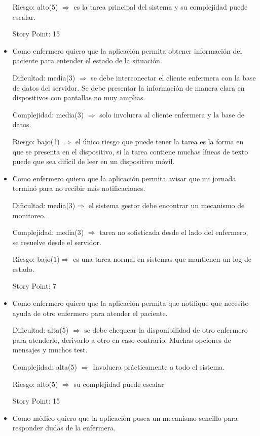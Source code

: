 \documentclass[
11pt, %
]{charter}
\begin{document}
\begin{itemize}
Riesgo: alto(5) $\Rightarrow$ es la tarea principal del sistema y su complejidad puede escalar.

Story Point: 15


\item Como enfermero quiero que la aplicación permita obtener información del paciente para entender el estado de la situación.

Dificultad: media(3) $\Rightarrow$ se debe interconectar el cliente enfermera con la base de datos del servidor. Se debe presentar la información de manera clara en dispositivos con pantallas no muy amplias.

Complejidad: media(3) $\Rightarrow$  solo involucra al cliente enfermera y la base de datos.

Riesgo: bajo(1) $\Rightarrow$ el único riesgo que puede tener la tarea es la forma en que se presenta en el dispositivo, si la tarea contiene muchas líneas de texto puede que sea difícil de leer en un dispositivo móvil.


\item Como enfermero quiero que la aplicación permita avisar que mi jornada terminó para no recibir más notificaciones.

Dificultad: media(3)$\Rightarrow$ el sistema gestor debe encontrar un mecanismo de monitoreo.

Complejidad: media(3) $\Rightarrow$ tarea no sofisticada desde el lado del enfermero, se resuelve desde el servidor.

Riesgo: bajo(1)$\Rightarrow$ es una tarea normal en sistemas que mantienen un log de estado.

Story Point: 7


\item Como enfermero quiero que la aplicación permita que notifique que necesito ayuda de otro enfermero para atender el paciente.


Dificultad: alta(5) $\Rightarrow$ se debe chequear la disponibilidad de otro enfermero para atenderlo, derivarlo a otro en caso contrario. Muchas opciones de mensajes y muchos test.

Complejidad: alta(5) $\Rightarrow$ Involucra prácticamente a todo el sistema.

Riesgo: alto(5) $\Rightarrow$ su complejidad puede escalar

Story Point: 15

\item Como médico quiero que la aplicación posea un mecanismo sencillo para responder dudas de la enfermera.


\end{itemize}
\end{document}
